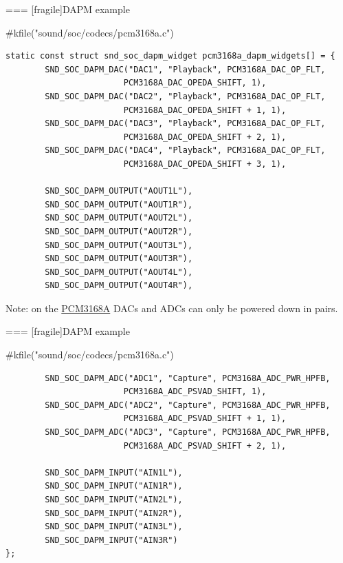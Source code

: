 === [fragile]{DAPM example}
  \begin{block}{#kfile("sound/soc/codecs/pcm3168a.c")}
    \fontsize{8}{7}\selectfont
    \begin{verbatim}
static const struct snd_soc_dapm_widget pcm3168a_dapm_widgets[] = {
        SND_SOC_DAPM_DAC("DAC1", "Playback", PCM3168A_DAC_OP_FLT,
                        PCM3168A_DAC_OPEDA_SHIFT, 1),
        SND_SOC_DAPM_DAC("DAC2", "Playback", PCM3168A_DAC_OP_FLT,
                        PCM3168A_DAC_OPEDA_SHIFT + 1, 1),
        SND_SOC_DAPM_DAC("DAC3", "Playback", PCM3168A_DAC_OP_FLT,
                        PCM3168A_DAC_OPEDA_SHIFT + 2, 1),
        SND_SOC_DAPM_DAC("DAC4", "Playback", PCM3168A_DAC_OP_FLT,
                        PCM3168A_DAC_OPEDA_SHIFT + 3, 1),

        SND_SOC_DAPM_OUTPUT("AOUT1L"),
        SND_SOC_DAPM_OUTPUT("AOUT1R"),
        SND_SOC_DAPM_OUTPUT("AOUT2L"),
        SND_SOC_DAPM_OUTPUT("AOUT2R"),
        SND_SOC_DAPM_OUTPUT("AOUT3L"),
        SND_SOC_DAPM_OUTPUT("AOUT3R"),
        SND_SOC_DAPM_OUTPUT("AOUT4L"),
        SND_SOC_DAPM_OUTPUT("AOUT4R"),
    \end{verbatim}
  \end{block}
  Note: on the \href{https://www.ti.com/lit/gpn/pcm3168a}{PCM3168A} DACs
  and ADCs can only be powered down in pairs.


=== [fragile]{DAPM example}
  \begin{block}{#kfile("sound/soc/codecs/pcm3168a.c")}
    \fontsize{8}{7}\selectfont
    \begin{verbatim}
        SND_SOC_DAPM_ADC("ADC1", "Capture", PCM3168A_ADC_PWR_HPFB,
                        PCM3168A_ADC_PSVAD_SHIFT, 1),
        SND_SOC_DAPM_ADC("ADC2", "Capture", PCM3168A_ADC_PWR_HPFB,
                        PCM3168A_ADC_PSVAD_SHIFT + 1, 1),
        SND_SOC_DAPM_ADC("ADC3", "Capture", PCM3168A_ADC_PWR_HPFB,
                        PCM3168A_ADC_PSVAD_SHIFT + 2, 1),

        SND_SOC_DAPM_INPUT("AIN1L"),
        SND_SOC_DAPM_INPUT("AIN1R"),
        SND_SOC_DAPM_INPUT("AIN2L"),
        SND_SOC_DAPM_INPUT("AIN2R"),
        SND_SOC_DAPM_INPUT("AIN3L"),
        SND_SOC_DAPM_INPUT("AIN3R")
};
    \end{verbatim}
  \end{block}


